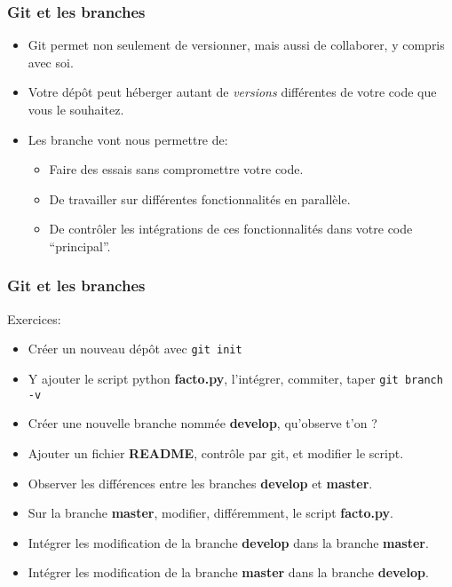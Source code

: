 \documentclass{beamer}
\begin{document}
\begin{frame}[fragile]\frametitle{Git et les branches}
  \begin{itemize}
  \item Git permet non seulement de versionner, mais aussi de collaborer, y compris avec soi.
  \item Votre dépôt peut héberger autant de {\em versions} différentes de votre code que vous le souhaitez.
  \item Les branche vont nous permettre de:
    \begin{itemize}
    \item Faire des essais sans compromettre votre code.
    \item De travailler sur différentes fonctionnalités en parallèle.
    \item De contrôler les intégrations de ces fonctionnalités dans votre code {``principal''}.
    \end{itemize}
  \end{itemize}
\end{frame}

\begin{frame}[fragile]\frametitle{Git et les branches}
  Exercices:
  \begin{itemize}
  \item Créer un nouveau dépôt avec {\tt git init}
  \item Y ajouter le script python {\bf facto.py}, l'intégrer, commiter, taper {\tt git branch -v}
  \item Créer une nouvelle branche nommée {\bf develop}, qu'observe t'on ?
  \item Ajouter un fichier {\bf README}, contrôle par git, et modifier le script.
  \item Observer les différences entre les branches {\bf develop} et {\bf master}.
  \item Sur la branche {\bf master}, modifier, différemment, le script {\bf facto.py}.
  \item Intégrer les modification de la branche {\bf develop} dans la branche {\bf master}.
  \item Intégrer les modification de la branche {\bf master} dans la branche {\bf develop}.
  \end{itemize}
\end{frame}
\end{document}
